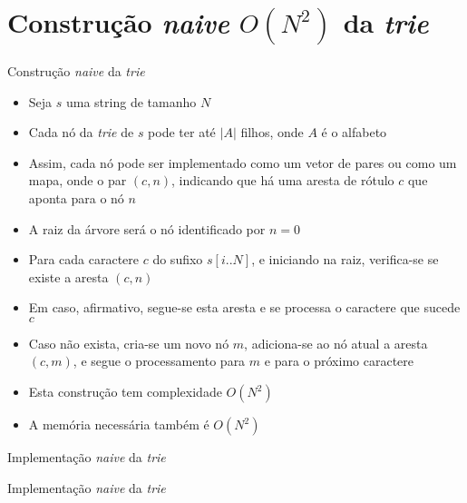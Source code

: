 \section{Construção {\it naive} $O(N^2)$ da {\it trie}}

\begin{frame}[fragile]{Construção {\it naive} da {\it trie}}

    \begin{itemize}
        \item Seja $s$ uma string de tamanho $N$

        \item Cada nó da {\it trie} de $s$ pode ter até $|A|$ filhos, onde $A$ é o alfabeto

        \item Assim, cada nó pode ser implementado como um vetor de pares ou como um mapa,
            onde o par $(c, n)$, indicando que há uma aresta de rótulo $c$ que aponta para o
            nó $n$

        \item A raiz da árvore será o nó identificado por $n = 0$

        \item Para cada caractere $c$ do sufixo $s[i..N]$, e iniciando na raiz,
            verifica-se se existe a aresta $(c, n)$

        \item Em caso, afirmativo, segue-se esta aresta e se processa o caractere que sucede $c$

        \item Caso não exista, cria-se um novo nó $m$, adiciona-se ao nó atual a aresta
            $(c, m)$, e segue o processamento para $m$ e para o próximo caractere
    
        \item Esta construção tem complexidade $O(N^2)$

        \item A memória necessária também é $O(N^2)$
    \end{itemize}

\end{frame}

\begin{frame}[fragile]{Implementação {\it naive} da {\it trie}}
\end{frame}

\begin{frame}[fragile]{Implementação {\it naive} da {\it trie}}
\end{frame}

